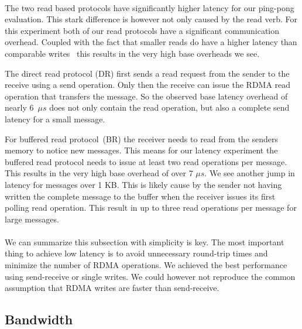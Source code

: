 \paragraph{} The two read based protocols have significantly higher latency for our ping-pong evaluation. This stark difference
is however not only caused by the read verb. For this experiment both of our read protocols have a significant 
communication overhead. Coupled with the fact that smaller reads do have a higher latency than comparable writes~\cite{}
this results in the very high base overheads we see.

The direct read protocol (DR) first sends a read request from the sender to the receive using a send operation. Only then the
receive can issue the RDMA read operation that transfers the message. So the observed base latency overhead of nearly 6~$\mu s$
does not only contain the read operation, but also a complete send latency for a small message.

For buffered read protocol~(BR) the receiver needs to read from the senders memory to notice new messages. This means for our
latency experiment the buffered read protocol needs to issue at least two read operations per message. This results in the
very high base overhead of over 7 $\mu s$. We see another jump in latency for messages over 1 KB. This is likely cause by the
sender not having written the complete message to the buffer when the receiver issues its first polling read operation. 
This result in up to three read operations per message for large messages.

\paragraph{} We can summarize this subsection with simplicity is key. The most important thing to achieve low 
latency is to avoid unnecessary round-trip times and minimize the number of RDMA operations. We achieved the best performance 
using send-receive or single writes. We could however not reproduce the common assumption that RDMA writes are faster 
than send-receive.






\pagebreak

\subsection{Bandwidth}

